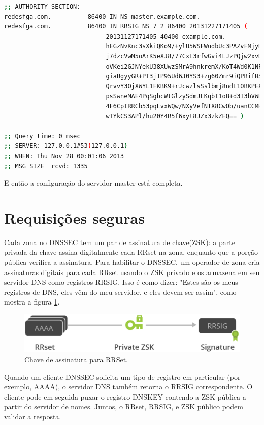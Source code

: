 \documentclass[12pt,openright,a4paper]{report}
\begin{document}
{\begin{lstlisting}[language=bash]
;; AUTHORITY SECTION:
redesfga.com.          86400 IN NS master.example.com.
redesfga.com.          86400 IN RRSIG NS 7 2 86400 20131227171405 (
                            20131127171405 40400 example.com.
                            hEGzNvKnc3sXkiQKo9/+ylU5WSFWudbUc3PAZvFMjyRA
                            j7dzcVwM5oArK5eXJ8/77CxL3rfwGvi4LJzPQjw2xvDI
                            oVKei2GJNYekU38XUwzSMrA9hnkremX/KoT4Wd0K1NPy
                            giaBgyyGR+PT3jIP95Ud6J0YS3+zg60Zmr9iQPBifH3p
                            QrvvY3OjXWYL1FKBK9+rJcwzlsSslbmj8ndL1OBKPEX3
                            psSwneMAE4PqSgbcWtGlzySdmJLKqbI1oB+d3I3bVWRJ
                            4F6CpIRRCb53pqLvxWQw/NXyVefNTX8CwOb/uanCCMH8
                            wTYkCS3APl/hu20Y4R5f6xyt8JZx3zkZEQ== )

;; Query time: 0 msec
;; SERVER: 127.0.0.1#53(127.0.0.1)
;; WHEN: Thu Nov 28 00:01:06 2013
;; MSG SIZE  rcvd: 1335
\end{lstlisting}

E então a configuração do servidor master está completa.

\section{Requisições seguras}
\label{sec_req_seguras}

Cada zona no DNSSEC tem um par de assinatura de chave(ZSK): a parte privada da chave assina digitalmente cada RRset na zona, enquanto que a porção pública verifica a assinatura. Para habilitar o DNSSEC, um operador de zona cria assinaturas digitais para cada RRset usando o ZSK privado e os armazena em seu servidor DNS como registros RRSIG. Isso é como dizer: "Estes são os meus registros de DNS, eles vêm do meu servidor, e eles devem ser assim", como mostra a figura \ref{fig:keys}.

\begin{figure}[h!]
	\centering
	\includegraphics[scale=0.4]{keys.eps}
	\caption{Chave de assinatura para RRSet.}
	\label{fig:keys}
\end{figure}

Quando um cliente DNSSEC solicita um tipo de registro em particular (por exemplo, AAAA), o servidor DNS também retorna o RRSIG correspondente. O cliente pode em seguida puxar o registro DNSKEY contendo a ZSK pública a partir do servidor de nomes. Juntos, o RRset, RRSIG, e ZSK público podem validar a resposta.

}
\end{document}
